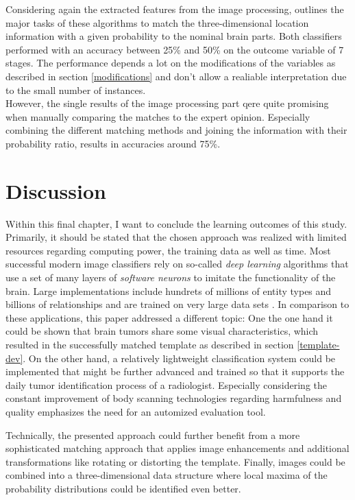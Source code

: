 \documentclass[twoside,11pt]{article}
\begin{document}
	Considering again the extracted features from the image processing, outlines the major tasks of these algorithms to match the three-dimensional location information with a given probability to the nominal brain parts.
	Both classifiers performed with an accuracy between 25\% and 50\% on the outcome variable of 7 stages. The performance depends a lot on the modifications of the variables as described in section \ref{modifications} and don't allow a realiable interpretation due to the small number of instances. 
	\\
	However, the single results of the image processing part qere quite promising when manually comparing the matches to the expert opinion.  Especially combining the different matching methods and joining the information with their probability ratio, results in accuracies around 75\%. 
	
\section{Discussion}
	Within this final chapter, I want to conclude the learning outcomes of this study. Primarily, it should be stated that the chosen approach was realized with limited resources regarding computing power, the training data as well as time. Most successful modern image classifiers rely on so-called \textit{deep learning} algorithms that use a set of many layers of \textit{software neurons} to imitate the functionality of the brain. Large implementations include hundrets of millions of entity types and billions of relationships and are trained on very large data sets \citep{deepLearning}. In comparison to these applications, this paper addressed a different topic: One the one hand it could be shown that brain tumors share some visual characteristics, which resulted in the successfully matched template as described in section \ref{template-dev}. On the other hand, a relatively lightweight classification system could be implemented that might be further advanced and trained so that it supports the daily tumor identification process of a radiologist. Especially considering the constant improvement of body scanning technologies regarding harmfulness and quality emphasizes the need for an automized evaluation tool. 
	
	Technically, the presented approach could further benefit from a more sophisticated matching approach that applies image enhancements and additional transformations like rotating or distorting the template. Finally, images could be combined into a three-dimensional data structure where local maxima of the probability distributions could be identified even better.
	
\end{document}
